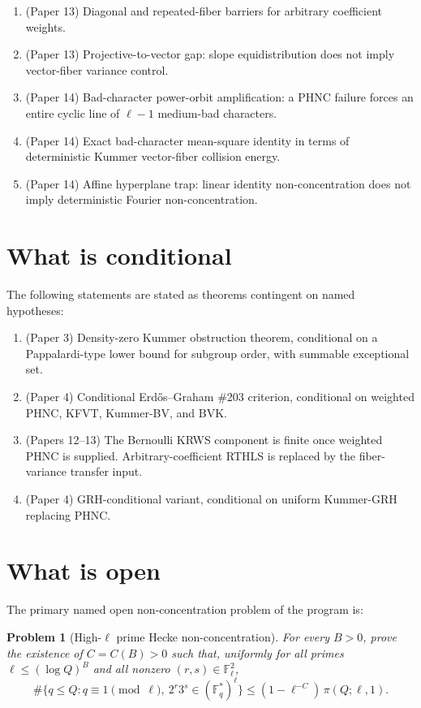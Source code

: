 \documentclass[11pt]{article}
\newtheorem{problem}{Problem}
\newcommand{\F}{\mathbb F}
\newcommand{\1}{\mathbf 1}
\begin{document}
\begin{enumerate}[leftmargin=2em]
\item (Paper 13) Diagonal and repeated-fiber barriers for arbitrary coefficient weights.
\item (Paper 13) Projective-to-vector gap: slope equidistribution does not imply vector-fiber variance control.
\item (Paper 14) Bad-character power-orbit amplification: a PHNC failure forces an entire cyclic line of \(\ell-1\) medium-bad characters.
\item (Paper 14) Exact bad-character mean-square identity in terms of deterministic Kummer vector-fiber collision energy.
\item (Paper 14) Affine hyperplane trap: linear identity non-concentration does not imply deterministic Fourier non-concentration.
\end{enumerate}

\section{What is conditional}

The following statements are stated as theorems contingent on named hypotheses:

\begin{enumerate}[leftmargin=2em]
\item (Paper 3) Density-zero Kummer obstruction theorem, conditional on a Pappalardi-type lower bound for subgroup order, with summable exceptional set.
\item (Paper 4) Conditional Erd\H{o}s--Graham \#203 criterion, conditional on weighted PHNC, KFVT, Kummer-BV, and BVK.
\item (Papers 12--13) The Bernoulli KRWS component is finite once weighted PHNC is supplied.  Arbitrary-coefficient RTHLS is replaced by the fiber-variance transfer input.
\item (Paper 4) GRH-conditional variant, conditional on uniform Kummer-GRH replacing PHNC.
\end{enumerate}

\section{What is open}

The primary named open non-concentration problem of the program is:

\begin{problem}[High-\(\ell\) prime Hecke non-concentration]
For every \(B>0\), prove the existence of \(C=C(B)>0\) such that, uniformly for all primes \(\ell\le(\log Q)^B\) and all nonzero \((r,s)\in\F_\ell^2\),
\[
\#\bigl\{q\le Q:q\equiv1\pmod\ell,\ 2^r3^s\in(\F_q^*)^\ell\bigr\}\le(1-\ell^{-C})\,\pi(Q;\ell,1).
\]
\end{problem}
\end{document}
